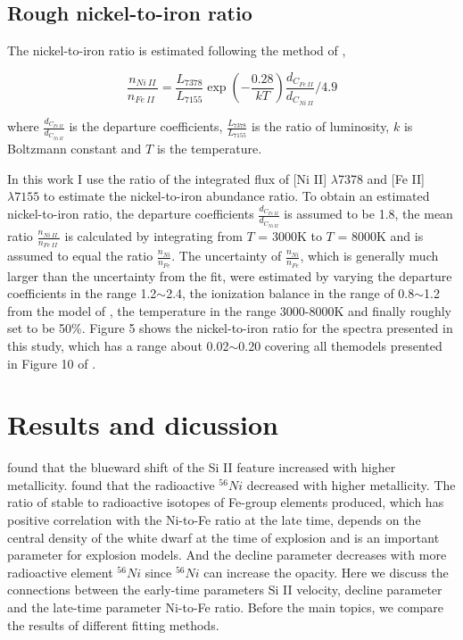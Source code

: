 \documentclass[twocolumn]{aastex631}
\begin{document}
\subsection{Rough nickel-to-iron ratio \label{subsec:ni-to-fe}}

The nickel-to-iron ratio is estimated following the method of \citet{2018MNRAS.477.3567M},

\begin{equation}
\frac{n_{Ni\ II}}{n_{Fe\ II}\ }=\frac{L_{7378}}{L_{7155}}\exp{\left(-\frac{0.28}{kT}\right)}\frac{d_{C_{Fe\ II}}}{d_{C_{Ni\ II}}}/4.9
\end{equation}

where $\frac{d_{C_{Fe\ II}}}{d_{C_{Ni\ II}}}$ is the departure coefficients, $\frac{L_{7378}}{L_{7155}}$ is the ratio of luminosity, $k$ is Boltzmann constant and $T$ is the temperature. 

In this work I use the ratio of the integrated flux of [Ni II] $\lambda$7378 and [Fe II] $\lambda7155$ to estimate the nickel-to-iron abundance ratio. To obtain an estimated nickel-to-iron ratio, the departure coefficients $\frac{d_{C_{Fe\ II}}}{d_{C_{Ni\ II}}}$ is assumed to be 1.8, the mean ratio $\frac{n_{Ni\ II}\ }{n_{Fe\ II}\ }$ is calculated by integrating from $T$ = 3000K to $T$ = 8000K and is assumed to equal the ratio $\frac{n_{Ni}}{n_{Fe}}$. The uncertainty of $\frac{n_{Ni}}{n_{Fe}}$, which is generally much larger than the uncertainty from the fit, were estimated by varying the departure coefficients in the range 1.2$\sim$2.4, the ionization balance in the range of 0.8$\sim$1.2 from the model of \citet{2015ApJ...814L...2F}, the temperature in the range 3000-8000K and finally roughly set to be 50\%. Figure 5 shows the nickel-to-iron ratio for the spectra presented in this study, which has a range about 0.02$\sim$0.20 covering all themodels presented in Figure 10 of \citet{2018MNRAS.477.3567M}.

\section{Results and dicussion} \label{sec:discussion}

\citet{2000ApJ...530..966L} found that the blueward shift of the Si II feature increased with higher metallicity. \citet{2003ApJ...590L..83T} found that the radioactive $^{56}Ni$ decreased with higher metallicity. The ratio of stable to radioactive isotopes of Fe-group elements produced, which
has positive correlation with the Ni-to-Fe ratio at the late time, depends on the central density of the white dwarf at the time of explosion \citep{2004ApJ...617.1258H} and is an important parameter for explosion models. And the decline parameter decreases with more radioactive element $^{56}Ni$ since $^{56}Ni$ can increase the opacity. Here we discuss the connections between the early-time parameters Si II velocity, decline parameter and the late-time parameter Ni-to-Fe ratio. Before the main topics, we compare the results of different fitting methods.
\end{document}
